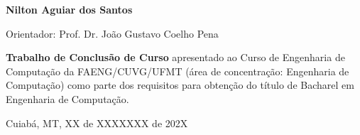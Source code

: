 \begin{titlepage}
\begin{center}
\textbf{Nilton Aguiar dos Santos}

\vfill

\normalsize

Orientador: Prof. Dr. João Gustavo Coelho Pena

\vfill

\hfill
\parbox{0.5\linewidth}{\textbf{%
Trabalho de Conclusão de Curso}
apresentado ao Curso de Engenharia de Computação da FAENG/CUVG/UFMT
(área de concentração: Engenharia de Computação)
como parte dos requisitos para obtenção do título de Bacharel
em Engenharia de Computação.}

\vfill

\large

Cuiabá, MT, XX de XXXXXXX de 202X

\end{center}

\end{titlepage}
